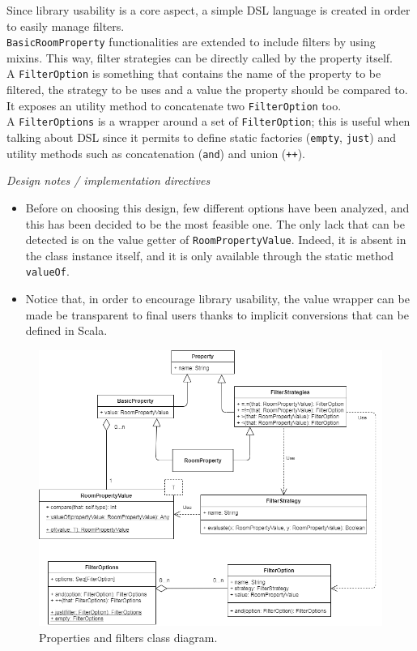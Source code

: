 \bigskip
Since library usability is a core aspect, a simple DSL language is created in order to easily manage filters.
\\
\texttt{BasicRoomProperty} functionalities are extended to include filters by using mixins. This way, filter strategies can be directly called by the property itself.
\\
A \texttt{FilterOption} is something that contains the name of the property to be filtered, the strategy to be uses and a value the property should be compared to. It exposes an utility method to concatenate two \texttt{FilterOption} too.
\\
A \texttt{FilterOptions} is a wrapper around a set of \texttt{FilterOption}; this is useful when talking about DSL since it permits to define static factories (\texttt{empty}, \texttt{just}) and utility methods such as concatenation (\texttt{and}) and union (\texttt{++}).

\bigskip
\textit{Design notes / implementation directives}
\begin{itemize}
\item Before on choosing this design, few different options have been analyzed, and this has been decided to be the most feasible one. The only lack that can be detected is on the value getter of \texttt{RoomPropertyValue}. Indeed, it is absent in the class instance itself, and it is only available through the static method \texttt{valueOf}.
\item Notice that, in order to encourage library usability, the value wrapper can be made be transparent to final users thanks to implicit conversions that can be defined in Scala.
\end{itemize}
\begin{figure}[H]
	\includegraphics[scale=0.45]{images/4-design/property_and_filters-class.png}
	\caption{Properties and filters class diagram.}
	\label{fig:property-class}
\end{figure}

